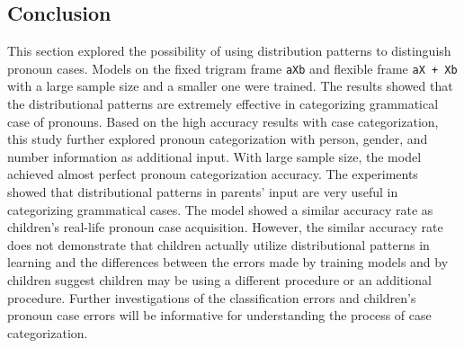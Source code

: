 \subsection{Conclusion}
This section explored the possibility of using distribution patterns to distinguish pronoun cases. Models on the fixed trigram frame \texttt{aXb} and flexible frame \texttt{aX + Xb} with a large sample size and a smaller one were trained. The results showed that the distributional patterns are extremely effective in categorizing grammatical case of pronouns. Based on the high accuracy results with case categorization, this study further explored pronoun categorization with person, gender, and number information as additional input. With large sample size, the model achieved almost perfect pronoun categorization accuracy. The experiments showed that distributional patterns in parents' input are very useful in categorizing grammatical cases. The model showed a similar accuracy rate as children's real-life pronoun case acquisition. However, the similar accuracy rate does not demonstrate that children actually utilize distributional patterns in learning and the differences between the errors made by training models and by children suggest children may be using a different procedure or an additional procedure. Further investigations of the classification errors and children's pronoun case errors will be informative for understanding the process of case categorization. 

